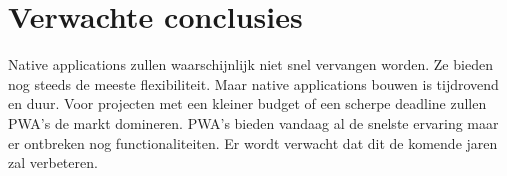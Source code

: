 \section{Verwachte conclusies}
\label{sec:verwachte_conclusies}

Native applications zullen waarschijnlijk niet snel vervangen worden. Ze bieden nog steeds de meeste flexibiliteit. Maar native applications bouwen is tijdrovend en duur. 
Voor projecten met een kleiner budget of een scherpe deadline zullen PWA's de markt domineren.
PWA's bieden vandaag al de snelste ervaring maar er ontbreken nog functionaliteiten. Er wordt verwacht dat dit de komende jaren zal verbeteren.




